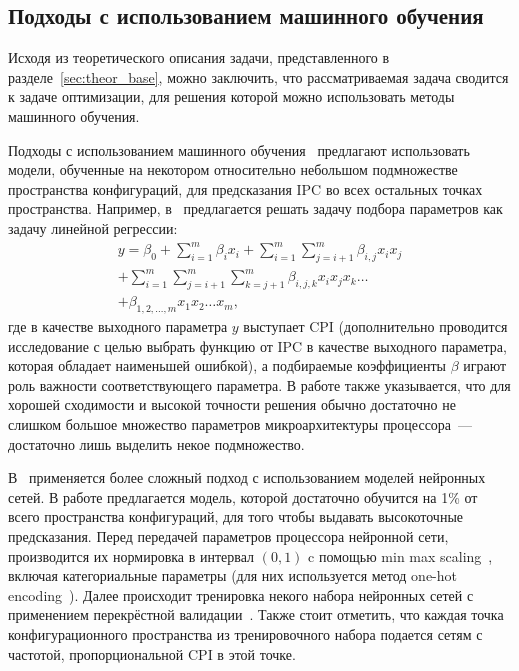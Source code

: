 \subsection{Подходы с использованием машинного обучения}


Исходя из теоретического описания задачи, представленного в разделе~\ref{sec:theor_base}, можно заключить, что рассматриваемая задача сводится к задаче оптимизации, для решения которой можно использовать методы машинного обучения.

Подходы с использованием машинного обучения~\cite{joseph2006construction,ipek2006efficiently,chen2014archranker} предлагают использовать модели, обученные на некотором относительно небольшом подмножестве пространства конфигураций, для предсказания IPC во всех остальных точках пространства.
Например, в~\cite{joseph2006construction} предлагается решать задачу подбора параметров как задачу линейной регрессии:
  \begin{multline}
    y = \beta_0 + \sum_{i = 1}^{m} \beta_i x_i + \sum_{i = 1}^{m}\sum_{j = i + 1}^{m}\beta_{i,j}x_ix_j \\  +\sum_{i = 1}^{m}\sum_{j = i + 1}^{m}\sum_{k = j + 1}^{m} \beta_{i,j,k} x_ix_jx_k
    \dots \\  +\beta_{1,2,\dots,m}x_1x_2\dots x_m,
  \end{multline}
где в качестве выходного параметра $y$ выступает CPI (дополнительно проводится исследование с целью выбрать функцию от IPC в качестве выходного параметра, которая обладает наименьшей ошибкой), а подбираемые коэффициенты $\beta$ играют роль важности соответствующего параметра. В работе также указывается, что для хорошей сходимости и высокой точности решения обычно достаточно не слишком большое множество параметров микроархитектуры процессора~--- достаточно лишь выделить некое подмножество.

В~\cite{ipek2006efficiently} применяется более сложный подход с использованием моделей нейронных сетей. В работе предлагается модель, которой достаточно обучится на 1\% от всего пространства конфигураций, для того чтобы выдавать высокоточные предсказания. Перед передачей параметров процессора нейронной сети, производится их нормировка в интервал $(0,1)$ c помощью min max scaling~\cite[114]{han2012data}, включая категориальные параметры (для них используется метод one-hot encoding~\cite{brownlee2017one}). Далее происходит тренировка некого набора нейронных сетей с применением перекрёстной валидации~\cite{stone1978cross}. Также стоит отметить, что каждая точка конфигурационного пространства из тренировочного набора подается сетям с частотой, пропорциональной CPI в этой точке.

